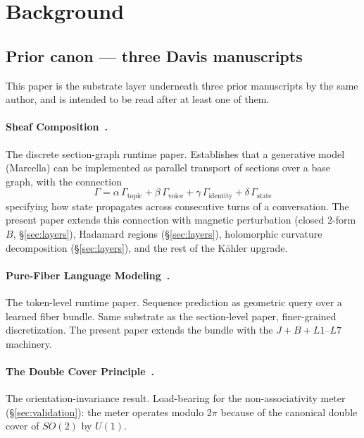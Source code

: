 \documentclass[11pt,letterpaper]{article}
\begin{document}
\section{Background}
\label{sec:background}

\subsection{Prior canon --- three Davis manuscripts}
\label{sec:prior-canon}

This paper is the substrate layer underneath three prior manuscripts
by the same author, and is intended to be read after at least one of
them.

\paragraph{Sheaf Composition~\cite{davis2026sheafcomposition}.}
The discrete section-graph runtime paper. Establishes that a
generative model (Marcella) can be implemented as parallel transport
of sections over a base graph, with the connection
\[
\Gamma = \alpha\,\Gamma_{\text{topic}} + \beta\,\Gamma_{\text{voice}}
       + \gamma\,\Gamma_{\text{identity}} + \delta\,\Gamma_{\text{state}}
\]
specifying how state propagates across consecutive turns of a
conversation. The present paper extends this connection with magnetic
perturbation (closed 2-form $B$, \S\ref{sec:layers}), Hadamard regions
(\S\ref{sec:layers}), holomorphic curvature decomposition
(\S\ref{sec:layers}), and the rest of the K\"ahler upgrade.

\paragraph{Pure-Fiber Language Modeling~\cite{davis2026purefiber}.}
The token-level runtime paper. Sequence prediction as geometric query
over a learned fiber bundle. Same substrate as the section-level
paper, finer-grained discretization. The present paper extends the
bundle with the $J + B + L1\text{--}L7$ machinery.

\paragraph{The Double Cover Principle~\cite{davis2026doublecover}.}
The orientation-invariance result. Load-bearing for the
non-associativity meter (\S\ref{sec:validation}): the meter operates
modulo $2\pi$ because of the canonical double cover of $SO(2)$ by
$U(1)$.
\end{document}
